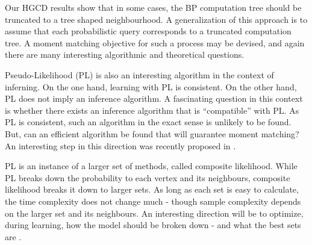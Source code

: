 Our HGCD results show that in some cases, the BP computation tree should be truncated to a tree shaped neighbourhood. A generalization of this approach is to assume that each probabilistic query corresponds to a truncated computation tree. A moment matching objective for such a process may be devised, and again there are many interesting algorithmic and theoretical questions.  


Pseudo-Likelihood (PL) is also an interesting algorithm in the context of inferning. On the one hand, learning with PL is consistent. On the other hand, PL does not imply an inference algorithm. A fascinating question in this context is whether there exists an inference algorithm that is ``compatible'' with PL. As PL is consistent, such an algorithm in the exact sense is unlikely to be found.
But, can an efficient algorithm be found that will guarantee moment matching? An interesting
step in this direction was recently proposed in \cite{bertasius2016local}.

PL is an instance of a larger set of methods, called composite likelihood. While PL breaks down the probability to each vertex and its neighbours, composite likelihood breaks it down to larger sets.
As long as each set is easy to calculate, the time complexity does not change much - though sample complexity depends on the larger set and its neighbours.
An interesting direction will be to optimize, during learning, how the model should be broken down - and what the best sets are \cite{dillon2010stochastic}.

